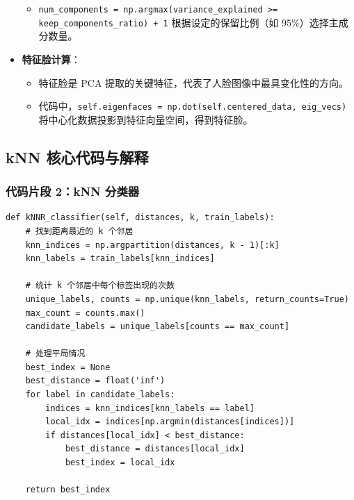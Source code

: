 \documentclass{article}
\begin{document}
\begin{itemize}
\begin{itemize}
        \item \texttt{num\_components = np.argmax(variance\_explained >= keep\_components\_ratio) + 1} 根据设定的保留比例（如 95\%）选择主成分数量。
    \end{itemize}
    \item \textbf{特征脸计算}：
    \begin{itemize}
        \item 特征脸是 PCA 提取的关键特征，代表了人脸图像中最具变化性的方向。
        \item 代码中，\texttt{self.eigenfaces = np.dot(self.centered\_data, eig\_vecs)} 将中心化数据投影到特征向量空间，得到特征脸。
    \end{itemize}
\end{itemize}

\subsection{kNN 核心代码与解释}

\subsubsection{代码片段 2：kNN 分类器}
\begin{lstlisting}[basicstyle=\scriptsize\ttfamily, linewidth=\textwidth]
def kNNR_classifier(self, distances, k, train_labels):
    # 找到距离最近的 k 个邻居
    knn_indices = np.argpartition(distances, k - 1)[:k]
    knn_labels = train_labels[knn_indices]

    # 统计 k 个邻居中每个标签出现的次数
    unique_labels, counts = np.unique(knn_labels, return_counts=True)
    max_count = counts.max()
    candidate_labels = unique_labels[counts == max_count]

    # 处理平局情况
    best_index = None
    best_distance = float('inf')
    for label in candidate_labels:
        indices = knn_indices[knn_labels == label]
        local_idx = indices[np.argmin(distances[indices])]
        if distances[local_idx] < best_distance:
            best_distance = distances[local_idx]
            best_index = local_idx

    return best_index
\end{lstlisting}
\end{document}
